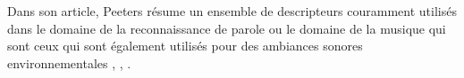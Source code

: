 Dans son article, Peeters \cite{Peeters} résume un ensemble de descripteurs couramment utilisés dans le domaine de la reconnaissance de parole \cite{Kim} ou le domaine de la musique \cite{Fu} qui sont ceux qui sont également utilisés pour des ambiances sonores environnementales \cite{Cowling}, \cite{Haddad}, \cite{Defreville}. 


%

%
%
%
%
%

